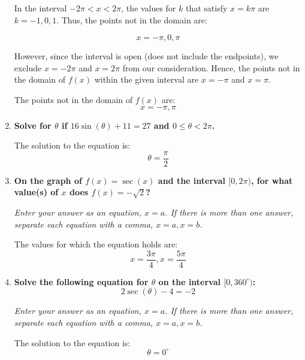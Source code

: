 \documentclass[12pt]{article}
\begin{document}
\begin{enumerate}
    In the interval \( -2\pi < x < 2\pi \), the values for \( k \) that satisfy \( x = k\pi \) are \( k = -1, 0, 1 \). Thus, the points not in the domain are:

    \[ x = -\pi, 0, \pi \]

    However, since the interval is open (does not include the endpoints), we exclude \( x = -2\pi \) and \( x = 2\pi \) from our consideration. Hence, the points not in the domain of \( f(x) \) within the given interval are \( x = -\pi \) and \( x = \pi \).

    \vspace{45mm}
    The points not in the domain of \( f(x) \) are:
    \[ x = -\pi, \pi \]
    \item \textbf{Solve for \( \theta \) if \( 16\sin(\theta) + 11 = 27 \) and \( 0 \leq \theta < 2\pi \).}
    
    The solution to the equation is:
    \[ \theta = \frac{\pi}{2} \]
    \vspace{45mm}
    \item \textbf{On the graph of \( f(x) = \sec(x) \) and the interval \( [0,2\pi) \), for what value(s) of \( x \) does \( f(x) = -\sqrt{2} \)?}
    
    \textit{Enter your answer as an equation, \( x=a \). If there is more than one answer, separate each equation with a comma, \( x=a, x=b \).}
    
    The values for which the equation holds are:
    \[ x = \frac{3\pi}{4}, x = \frac{5\pi}{4} \]
    \vspace{45mm}
   \newpage 
    \item \textbf{Solve the following equation for \( \theta \) on the interval \( [0,360^\circ) \):}
    \[ 2\sec(\theta) - 4 = -2 \]
    
    \textit{Enter your answer as an equation, \( x=a \). If there is more than one answer, separate each equation with a comma, \( x=a, x=b \).}
    
    The solution to the equation is:
    \[ \theta = 0^\circ \]
    \vspace{45mm}
 \end{enumerate}
\end{document}
